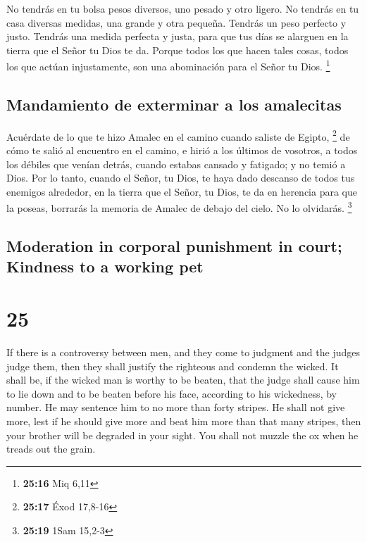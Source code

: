 \begin{paracol}{2}
 No tendrás en tu bolsa pesos diversos, uno pesado y otro
ligero.  No tendrás en tu casa diversas medidas, una
grande y otra pequeña.  Tendrás un peso perfecto y justo.
Tendrás una medida perfecta y justa, para que tus días se alarguen en la
tierra que el Señor tu Dios te da.  Porque todos los que
hacen tales cosas, todos los que actúan injustamente, son una
abominación para el Señor tu Dios. \footnote{\textbf{25:16} Miq 6,11}

\hypertarget{mandamiento-de-exterminar-a-los-amalecitas}{%
\subsection{Mandamiento de exterminar a los
amalecitas}\label{mandamiento-de-exterminar-a-los-amalecitas}}

 Acuérdate de lo que te hizo Amalec en el camino cuando
saliste de Egipto, \footnote{\textbf{25:17} Éxod 17,8-16}
 de cómo te salió al encuentro en el camino, e hirió a
los últimos de vosotros, a todos los débiles que venían detrás, cuando
estabas cansado y fatigado; y no temió a Dios.  Por lo
tanto, cuando el Señor, tu Dios, te haya dado descanso de todos tus
enemigos alrededor, en la tierra que el Señor, tu Dios, te da en
herencia para que la poseas, borrarás la memoria de Amalec de debajo del
cielo. No lo olvidarás. \footnote{\textbf{25:19} 1Sam 15,2-3}

\switchcolumn
\begin{otherlanguage}{english}

\hypertarget{moderation-in-corporal-punishment-in-court-kindness-to-a-working-pet}{%
\subsection{Moderation in corporal punishment in court; Kindness to a
working
pet}\label{moderation-in-corporal-punishment-in-court-kindness-to-a-working-pet}}

\hypertarget{section-49}{%
\section{25}\label{section-49}}

 If there is a controversy between men, and they come to
judgment and the judges judge them, then they shall justify the
righteous and condemn the wicked.  It shall be, if the
wicked man is worthy to be beaten, that the judge shall cause him to lie
down and to be beaten before his face, according to his wickedness, by
number.  He may sentence him to no more than forty
stripes. He shall not give more, lest if he should give more and beat
him more than that many stripes, then your brother will be degraded in
your sight.  You shall not muzzle the ox when he treads
out the grain.


\end{otherlanguage}
\end{paracol}
